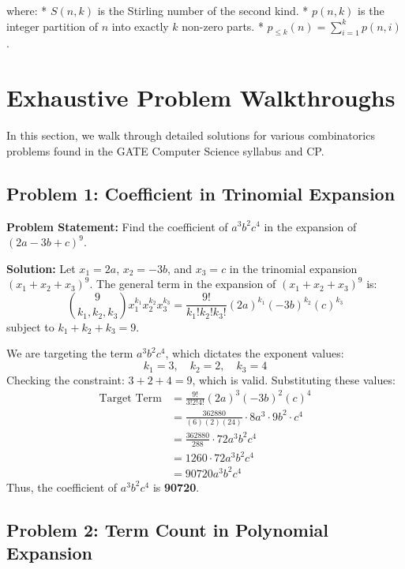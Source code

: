 \documentclass[10pt,journal,compsoc,onecolumn]{IEEEtran}
\begin{document}
where:
* $S(n, k)$ is the Stirling number of the second kind.
* $p(n, k)$ is the integer partition of $n$ into exactly $k$ non-zero parts.
* $p_{\le k}(n) = \sum_{i=1}^k p(n, i)$.

\section{Exhaustive Problem Walkthroughs}
\label{sec:problems}

In this section, we walk through detailed solutions for various combinatorics problems found in the GATE Computer Science syllabus and CP.

\subsection{Problem 1: Coefficient in Trinomial Expansion}

\textbf{Problem Statement:}
Find the coefficient of $a^3 b^2 c^4$ in the expansion of $(2a - 3b + c)^9$.

\textbf{Solution:}
Let $x_1 = 2a$, $x_2 = -3b$, and $x_3 = c$ in the trinomial expansion $(x_1 + x_2 + x_3)^9$.
The general term in the expansion of $(x_1 + x_2 + x_3)^9$ is:
\begin{equation}
\binom{9}{k_1, k_2, k_3} x_1^{k_1} x_2^{k_2} x_3^{k_3} = \frac{9!}{k_1! k_2! k_3!} (2a)^{k_1} (-3b)^{k_2} (c)^{k_3}
\end{equation}
subject to $k_1 + k_2 + k_3 = 9$.

We are targeting the term $a^3 b^2 c^4$, which dictates the exponent values:
\begin{equation}
k_1 = 3, \quad k_2 = 2, \quad k_3 = 4
\end{equation}
Checking the constraint: $3 + 2 + 4 = 9$, which is valid.
Substituting these values:
\begin{align}
\text{Target Term} &= \frac{9!}{3! 2! 4!} (2a)^3 (-3b)^2 (c)^4 \\
&= \frac{362880}{(6)(2)(24)} \cdot 8a^3 \cdot 9b^2 \cdot c^4 \\
&= \frac{362880}{288} \cdot 72 a^3 b^2 c^4 \\
&= 1260 \cdot 72 a^3 b^2 c^4 \\
&= 90720 a^3 b^2 c^4
\end{align}
Thus, the coefficient of $a^3 b^2 c^4$ is \textbf{90720}.

\subsection{Problem 2: Term Count in Polynomial Expansion}
\end{document}
